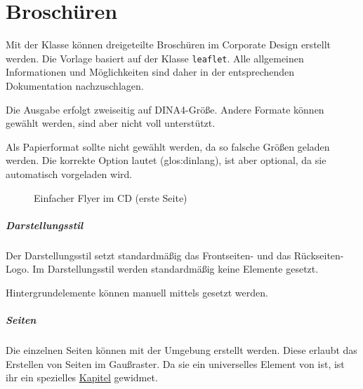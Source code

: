 \chapter{Broschüren}

Mit der Klasse  können dreigeteilte Broschüren
im Corporate Design erstellt werden.
Die Vorlage basiert auf der Klasse \texttt{leaflet}.
Alle allgemeinen Informationen und Möglichkeiten sind daher in der
entsprechenden Dokumentation\cite{cls:leaflet} nachzuschlagen.

Die Ausgabe erfolgt zweiseitig auf DINA4-Größe.
Andere Formate können gewählt werden, sind aber nicht voll unterstützt.

\begin{important}
  Als Papierformat sollte nicht  gewählt werden,
  da so falsche Größen geladen werden. Die korrekte Option lautet
   (\gls{glos:dinlang}),
  ist aber optional, da sie automatisch vorgeladen wird.
\end{important}


\begin{figure}[!ht]
  \caption{Einfacher Flyer im CD (erste Seite)}
\end{figure}

\paragraph{Darstellungsstil}\hfill

\begin{Declaration}
\end{Declaration}

Der Darstellungsstil  setzt standardmäßig das Frontseiten- und das
Rückseiten-Logo.
Im Darstellungsstil  werden standardmäßig keine Elemente gesetzt.

Hintergrundelemente können manuell mittels  gesetzt
werden.

\paragraph{Seiten}\hfill

Die einzelnen Seiten können mit der Umgebung  erstellt
werden. Diese erlaubt das Erstellen von Seiten im Gaußraster.
Da sie ein universelles Element von \tubslatex ist, ist ihr ein spezielles
\href{chap:gausspage}{Kapitel} gewidmet.